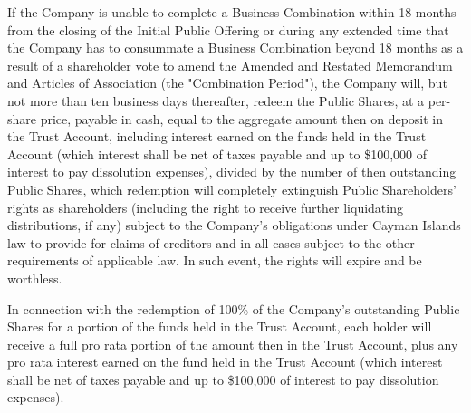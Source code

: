 \documentclass[11pt,a4paper]{article}
\begin{document}
If the Company is unable to complete a Business Combination within 18 months from the closing of the Initial Public Offering or during any extended time that the Company has to consummate a Business Combination beyond 18 months as a result of a shareholder vote to amend the Amended and Restated Memorandum and Articles of Association (the "Combination Period"), the Company will, but not more than ten business days thereafter, redeem the Public Shares, at a per-share price, payable in cash, equal to the aggregate amount then on deposit in the Trust Account, including interest earned on the funds held in the Trust Account (which interest shall be net of taxes payable and up to \$100,000 of interest to pay dissolution expenses), divided by the number of then outstanding Public Shares, which redemption will completely extinguish Public Shareholders' rights as shareholders (including the right to receive further liquidating distributions, if any) subject to the Company's obligations under Cayman Islands law to provide for claims of creditors and in all cases subject to the other requirements of applicable law. In such event, the rights will expire and be worthless.

In connection with the redemption of 100\% of the Company's outstanding Public Shares for a portion of the funds held in the Trust Account, each holder will receive a full pro rata portion of the amount then in the Trust Account, plus any pro rata interest earned on the fund held in the Trust Account (which interest shall be net of taxes payable and up to \$100,000 of interest to pay dissolution expenses).
\end{document}
